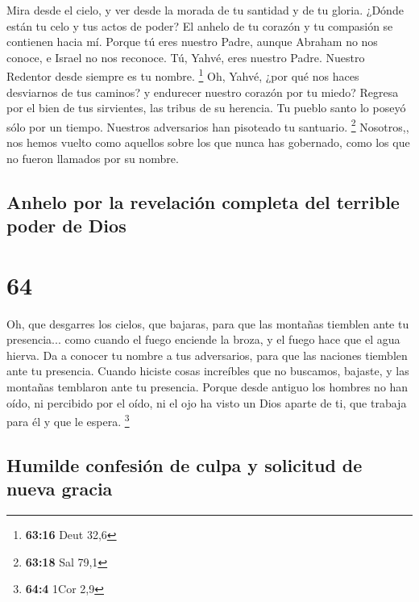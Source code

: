  Mira desde el cielo, y ver desde la morada de tu
santidad y de tu gloria. ¿Dónde están tu celo y tus actos de poder? El
anhelo de tu corazón y tu compasión se contienen hacia mí.
 Porque tú eres nuestro Padre, aunque Abraham no nos
conoce, e Israel no nos reconoce. Tú, Yahvé, eres nuestro Padre. Nuestro
Redentor desde siempre es tu nombre. \footnote{\textbf{63:16} Deut 32,6}
 Oh, Yahvé, ¿por qué nos haces desviarnos de tus caminos?
y endurecer nuestro corazón por tu miedo? Regresa por el bien de tus
sirvientes, las tribus de su herencia.  Tu pueblo santo
lo poseyó sólo por un tiempo. Nuestros adversarios han pisoteado tu
santuario. \footnote{\textbf{63:18} Sal 79,1}  Nosotros,,
nos hemos vuelto como aquellos sobre los que nunca has gobernado, como
los que no fueron llamados por su nombre.

\hypertarget{anhelo-por-la-revelaciuxf3n-completa-del-terrible-poder-de-dios}{%
\subsection{Anhelo por la revelación completa del terrible poder de
Dios}\label{anhelo-por-la-revelaciuxf3n-completa-del-terrible-poder-de-dios}}

\hypertarget{section-63}{%
\section{64}\label{section-63}}

 Oh, que desgarres los cielos, que bajaras, para que las
montañas tiemblen ante tu presencia...  como cuando el
fuego enciende la broza, y el fuego hace que el agua hierva. Da a
conocer tu nombre a tus adversarios, para que las naciones tiemblen ante
tu presencia.  Cuando hiciste cosas increíbles que no
buscamos, bajaste, y las montañas temblaron ante tu presencia.
 Porque desde antiguo los hombres no han oído, ni
percibido por el oído, ni el ojo ha visto un Dios aparte de ti, que
trabaja para él y que le espera. \footnote{\textbf{64:4} 1Cor 2,9}

\hypertarget{humilde-confesiuxf3n-de-culpa-y-solicitud-de-nueva-gracia}{%
\subsection{Humilde confesión de culpa y solicitud de nueva
gracia}\label{humilde-confesiuxf3n-de-culpa-y-solicitud-de-nueva-gracia}}

